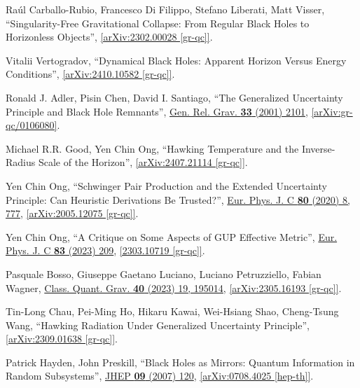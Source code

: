 \documentclass[preprintnumbers, floatfix, preprintnumbers, letterpaper, twocolumn, superscriptaddress,nofootinbib]{revtex4-2}
\begin{document}
\begin{thebibliography}{99}
Raúl Carballo-Rubio, Francesco Di Filippo, Stefano Liberati, Matt Visser, ``Singularity-Free Gravitational Collapse: From Regular Black Holes to Horizonless Objects'', \href{https://arxiv.org/abs/2302.00028}{[arXiv:2302.00028 [gr-qc]]}.

Vitalii Vertogradov, ``Dynamical Black Holes: Apparent Horizon Versus Energy Conditions'', \href{https://arxiv.org/abs/2410.10582}{[arXiv:2410.10582 [gr-qc]]}.

Ronald J. Adler, Pisin Chen, David I. Santiago, ``The Generalized Uncertainty Principle and Black Hole Remnants'', {\hypersetup{urlcolor=vividviolet}\href{https://link.springer.com/article/10.1023/A:1015281430411}{Gen. Rel. Grav. \textbf{33} (2001) 2101}}, \href{https://arxiv.org/abs/gr-qc/0106080}{[arXiv:gr-qc/0106080]}.

Michael R.R. Good, Yen Chin Ong, ``Hawking Temperature and the Inverse-Radius Scale of the Horizon'', \href{https://arxiv.org/abs/2407.21114}{[arXiv:2407.21114 [gr-qc]]}.

Yen Chin Ong, ``Schwinger Pair Production and the Extended Uncertainty Principle: Can Heuristic Derivations Be Trusted?'', {\hypersetup{urlcolor=vividviolet}\href{https://link.springer.com/article/10.1140/epjc/s10052-020-8363-2}{Eur. Phys. J. C \textbf{80} (2020) 8, 777}}, \href{https://arxiv.org/abs/2005.12075}{[arXiv:2005.12075 [gr-qc]]}.

Yen Chin Ong, ``A Critique on Some Aspects of GUP Effective Metric'', {\hypersetup{urlcolor=vividviolet}\href{https://link.springer.com/article/10.1140/epjc/s10052-023-11360-x}{Eur. Phys. J. C \textbf{83} (2023) 209}}, \href{https://arxiv.org/abs/2303.10719}{[2303.10719 [gr-qc]]}.

Pasquale Bosso, Giuseppe Gaetano Luciano, Luciano Petruzziello, Fabian Wagner, {\hypersetup{urlcolor=vividviolet}\href{https://iopscience.iop.org/article/10.1088/1361-6382/acf021}{Class. Quant. Grav. \textbf{40} (2023) 19, 195014}}, \href{https://arxiv.org/abs/2305.16193}{[arXiv:2305.16193 [gr-qc]]}.

Tin-Long Chau, Pei-Ming Ho, Hikaru Kawai, Wei-Hsiang Shao, Cheng-Tsung Wang, ``Hawking Radiation Under Generalized Uncertainty Principle'', \href{https://arxiv.org/abs/2309.01638}{[arXiv:2309.01638 [gr-qc]]}. 

Patrick Hayden, John Preskill, ``Black Holes as Mirrors: Quantum Information in Random Subsystems'', {\hypersetup{urlcolor=vividviolet}\href{https://iopscience.iop.org/article/10.1088/1126-6708/2007/09/120}{JHEP \textbf{09} (2007) 120}}, \href{https://arxiv.org/abs/0708.4025}{[arXiv:0708.4025 [hep-th]]}.


\end{thebibliography}
\end{document}
